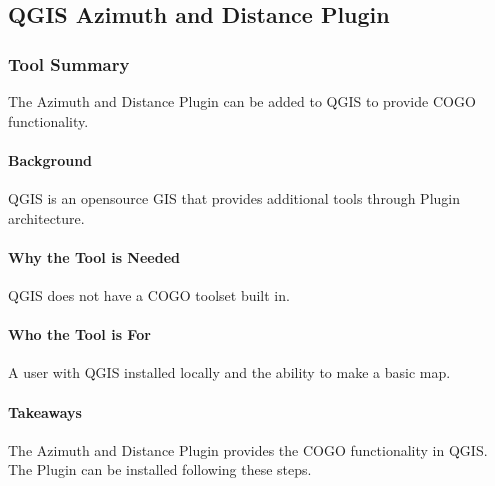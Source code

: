 %
%
%
%   

\subsection{QGIS Azimuth and Distance Plugin}
\subsubsection{Tool Summary}
The Azimuth and Distance Plugin can be added to QGIS to provide COGO functionality.
\begin{adjmulticols}{2}{\innerMar}{\outerMar}
\paragraph{Background}
\noindent QGIS is an opensource GIS that provides additional tools through Plugin architecture.
\paragraph{Why the Tool is Needed}
QGIS does not have a COGO toolset built in.
\paragraph{Who the Tool is For}
A user with QGIS installed locally and the ability to make a basic map.
\paragraph{Takeaways}
The Azimuth and Distance Plugin provides the COGO functionality in QGIS.\\

\noindent The Plugin can be installed following these steps.

\end{adjmulticols}
\clearpage
